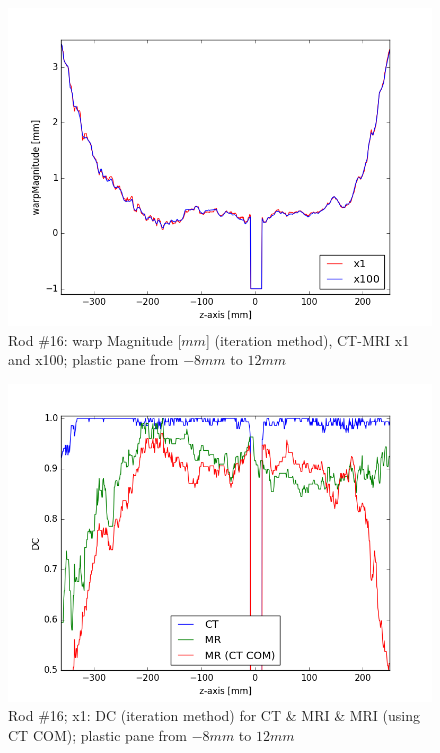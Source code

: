\begin{figure}[!tbh]
    \centering
    \includegraphics[scale=0.6]{../fig/python/ph3_v2/warp/ph3_MR_v2_x1-100_warpMagnitude_iter.png}
    \caption{Rod \#16: warp Magnitude [$mm$] (iteration method), CT-MRI x1 and x100; plastic pane from $-8mm$ to $12mm$}
    \label{fig:ph3_v2_warpMagnitude_x1-100}
\end{figure}

\begin{figure}[!tbh]
    \centering
    \includegraphics[scale=0.6]{../fig/python/ph3_v2/dice/ph3_MR_v2_x1_DC_iter.png}
    \caption{Rod \#16; x1: DC (iteration method) for CT \& MRI \& MRI (using CT COM); plastic pane from $-8mm$ to $12mm$}
    \label{fig:ph3_DC_x1}
\end{figure}


